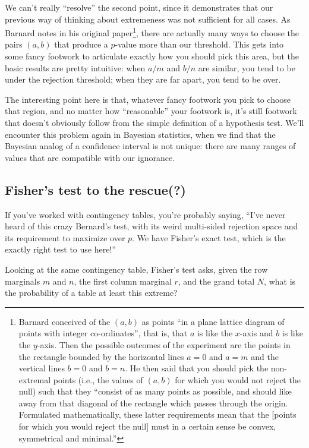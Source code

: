 \documentclass{book}
\begin{document}
We can't really ``resolve'' the second point, since it demonstrates that
our previous way of thinking about extremeness was not sufficient for
all cases. As Barnard notes in his original paper\footnote{Barnard
  conceived of the \((a, b)\) as points ``in a plane lattice diagram of
  points with integer co-ordinates'', that is, that \(a\) is like the
  \(x\)-axis and \(b\) is like the \(y\)-axis. Then the possible
  outcomes of the experiment are the points in the rectangle bounded by
  the horizontal lines \(a = 0\) and \(a = m\) and the vertical lines
  \(b = 0\) and \(b = n\). He then said that you should pick the
  non-extremal points (i.e., the values of \((a, b)\) for which you
  would not reject the null) such that they ``consist of as many points
  as possible, and should like away from that diagonal of the rectangle
  which passes through the origin. Formulated mathematically, these
  latter requirements mean that the {[}points for which you would reject
  the null{]} must in a certain sense be convex, symmetrical and
  minimal.''}, there are actually many ways to choose the pairs
\((a, b)\) that produce a \(p\)-value more than our threshold. This gets
into some fancy footwork to articulate exactly how you should pick this
area, but the basic results are pretty intuitive: when \(a/m\) and
\(b/n\) are similar, you tend to be under the rejection threshold; when
they are far apart, you tend to be over.

The interesting point here is that, whatever fancy footwork you pick to
choose that region, and no matter how ``reasonable'' your footwork is,
it's still footwork that doesn't obviously follow from the simple
definition of a hypothesis test. We'll encounter this problem again in
Bayesian statistics, when we find that the Bayesian analog of a
confidence interval is not unique: there are many ranges of values that
are compatible with our ignorance.

\subsection{Fisher's test to the
rescue(?)}\label{fishers-test-to-the-rescue}

If you've worked with contingency tables, you're probably saying, ``I've
never heard of this crazy Bernard's test, with its weird multi-sided
rejection space and its requirement to maximize over \(p\). We have
Fisher's exact test, which is the exactly right test to use here!''

Looking at the same contingency table, Fisher's test asks, given the row
marginals \(m\) and \(n\), the first column marginal \(r\), and the
grand total \(N\), what is the probability of a table at least this
extreme?
\end{document}
